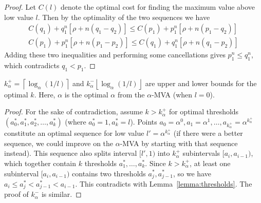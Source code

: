 \begin{proof}
Let $C(l)$ denote the optimal cost for finding the maximum value above low
value $l$.
Then by the optimality of the two sequences we have
\begin{align*}
  C(q_1) + q_1^n [\rho+n(q_1-q_2)] \leq C(p_1) + p_1^n [\rho + n(p_1-q_2)]\\
  C(p_1) + p_1^n [\rho+n(p_1-p_2)] \leq C(q_1) + q_1^n [\rho + n(q_1-p_2)]
\end{align*}
Adding these two inequalities and performing some cancellations gives
$p_1^n \leq q_1^n$, which contradicts $q_1 < p_1$.
\end{proof}


\begin{theorem}\label{theorem:k_bounds}
$k_\alpha^+ = \left\lceil \log_{\alpha} \left(1/l\right) \right\rceil$ and 
$k_\alpha^- \left\lfloor \log_{\alpha} \left(1/l\right) \right\rfloor$ are upper
and lower bounds for the optimal $k$. Here, $\alpha$ is the optimal $\alpha$
from the
$\alpha$-MVA (when $l = 0$). 
\end{theorem}
\begin{proof}
For the sake of contradiction, assume $k > k_\alpha^+$ for optimal thresholds
$(a^*_0, a^*_1, a^*_2, \ldots, a^*_k)$ (where $a^*_0 = 1, a^*_k = l$).  
Points $a_0 = \alpha^0, a_1 = \alpha^1, \ldots, a_{k_\alpha^+} = \alpha^{k_\alpha^+}$
constitute an optimal sequence for low value $l'=\alpha^{k_\alpha^+}$ (if there were a
better sequence, we could improve on the $\alpha$-MVA by starting
with that sequence instead).
This sequence also
splits interval $[l', 1)$ into $k_\alpha^+$ subintervals $[a_i, a_{i-1})$, which
together contain $k$ thresholds $a^*_1, \ldots, a^*_k$. Since $k > k_\alpha^+$, at
least one subinterval $[a_i, a_{i-1})$ contains two thresholds $a^*_j,
a^*_{j-1}$, so we have $a_i \leq a^*_j < a^*_{j-1} < a_{i-1}$.  This
contradicts with Lemma~\ref{lemma:thresholds}.
The proof of $k_\alpha^-$ is similar.
\end{proof}


